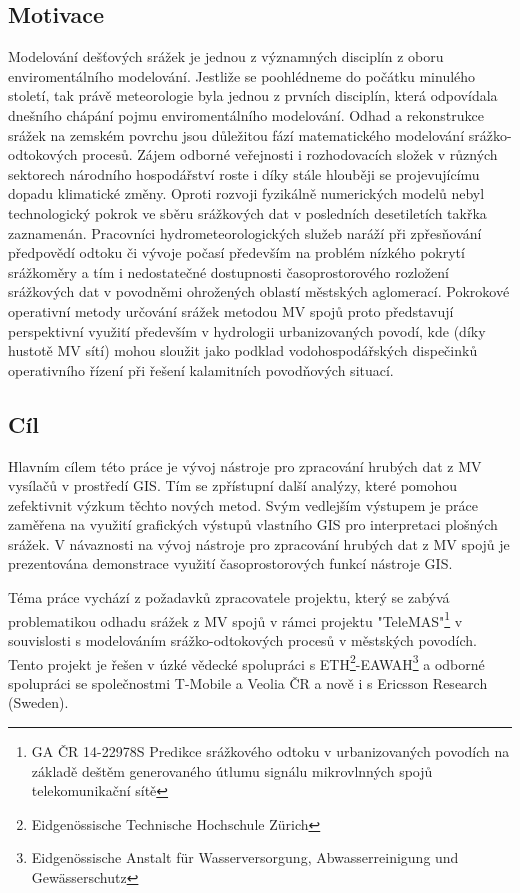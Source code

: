 \documentclass[a4paper,12pt,oneside]{report}
\begin{document}
\subsection*{Motivace}
Modelování dešťových srážek je jednou z významných disciplín z oboru enviromentálního modelování. Jestliže se poohlédneme do počátku  minulého století, tak právě meteorologie byla jednou z prvních disciplín, která odpovídala dnešního chápání pojmu enviromentálního modelování. Odhad a rekonstrukce srážek na zemském povrchu jsou důležitou fází matematického modelování srážko-odtokových procesů. Zájem odborné veřejnosti i rozhodovacích složek v  různých sektorech národního hospodářství roste i díky stále hlouběji se projevujícímu dopadu klimatické změny. Oproti rozvoji fyzikálně numerických modelů nebyl technologický pokrok ve sběru srážkových dat v posledních desetiletích takřka zaznamenán. Pracovníci hydrometeorologických služeb naráží při zpřesňování  předpovědí odtoku či vývoje počasí především na problém nízkého pokrytí srážkoměry a tím i nedostatečné dostupnosti časoprostorového rozložení srážkových dat v povodněmi ohrožených oblastí městských aglomerací. Pokrokové operativní metody určování srážek metodou MV spojů proto představují perspektivní využití především v hydrologii urbanizovaných povodí, kde (díky hustotě MV sítí) mohou sloužit jako podklad vodohospodářských dispečinků operativního řízení při řešení kalamitních povodňových situací.



\subsection*{Cíl}
Hlavním cílem této práce je vývoj nástroje pro zpracování hrubých dat
z MV vysílačů v prostředí GIS. Tím se zpřístupní další analýzy, které
pomohou zefektivnit výzkum těchto nových metod. Svým vedlejším
výstupem je práce zaměřena na využití grafických výstupů vlastního GIS
pro interpretaci plošných srážek. V návaznosti na vývoj nástroje pro
zpracování hrubých dat z MV spojů je prezentována demonstrace využití
časoprostorových funkcí nástroje GIS.

Téma práce vychází z požadavků zpracovatele projektu, který se zabývá
problematikou odhadu srážek z MV spojů v rámci projektu
"TeleMAS"\footnote{GA ČR 14-22978S Predikce srážkového odtoku v
  urbanizovaných povodích na základě deštěm generovaného útlumu
  signálu mikrovlnných spojů telekomunikační sítě} v souvislosti s
modelováním srážko-odtokových procesů v městských povodích. Tento
projekt je řešen v úzké vědecké spolupráci s ETH\footnote{
  Eidgenössische Technische Hochschule
  Zürich}-EAWAH\footnote{Eidgenössische Anstalt für Wasserversorgung,
  Abwasserreinigung und Gewässerschutz} a odborné spolupráci se
společnostmi T-Mobile a Veolia ČR a nově i s Ericsson Research
(Sweden).
\end{document}
